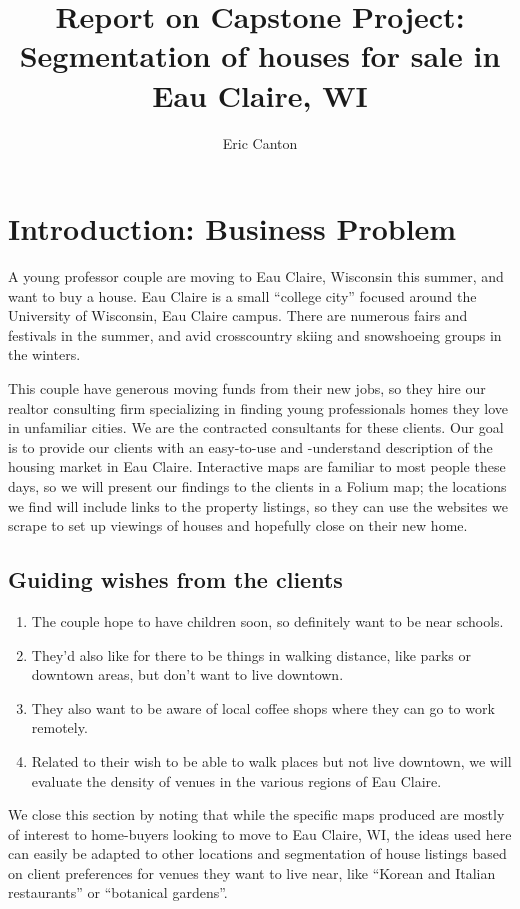 \documentclass{article}
\title{Report on Capstone Project:\\ Segmentation of houses for sale in Eau Claire, WI}
\author{Eric Canton}
\begin{document}
\maketitle

\section{Introduction: Business Problem}
A young professor couple are moving to Eau Claire, Wisconsin this summer, and want to buy a house. Eau Claire is a small ``college city'' focused around the University of Wisconsin, Eau Claire campus. There are numerous fairs and festivals in the summer, and avid crosscountry skiing and snowshoeing groups in the winters. 

This couple have generous moving funds from their new jobs, so they hire our realtor consulting firm specializing in finding young professionals homes they love in unfamiliar cities. We are the contracted consultants for these clients. Our goal is to provide our clients with an easy-to-use and -understand description of the housing market in Eau Claire. Interactive maps are familiar to most people these days, so we will present our findings to the clients in a Folium map; the locations we find will include links to the property listings, so they can use the websites we scrape to set up viewings of houses and hopefully close on their new home. 

\subsection{Guiding wishes from the clients}
\begin{enumerate}
\item The couple hope to have children soon, so definitely want to be near schools. 
\item They'd also like for there to be things in walking distance, like parks or
downtown areas, but don't want to live downtown.
\item They also want to be aware of local coffee shops where they can go to work remotely. 
\item Related to their wish to be able to walk places but not live downtown, we will evaluate the density of venues in the various regions of Eau Claire. 
\end{enumerate}

We close this section by noting that while the specific maps produced are mostly of interest to home-buyers looking to move to Eau Claire, WI, the ideas used here can easily be adapted to other locations and segmentation of house listings based on client preferences for venues they want to live near, like ``Korean and Italian restaurants'' or ``botanical gardens''. 
\end{document}
